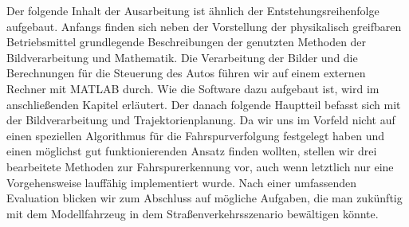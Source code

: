 Der folgende Inhalt der Ausarbeitung ist ähnlich der Entstehungsreihenfolge aufgebaut. Anfangs finden sich neben der Vorstellung der physikalisch greifbaren Betriebsmittel grundlegende Beschreibungen der genutzten Methoden der Bildverarbeitung und Mathematik. Die Verarbeitung der Bilder und die Berechnungen für die Steuerung des Autos führen wir auf einem externen Rechner mit MATLAB durch. Wie die Software dazu aufgebaut ist, wird im anschließenden Kapitel erläutert. Der danach folgende Hauptteil befasst sich mit der Bildverarbeitung und Trajektorienplanung. Da wir uns im Vorfeld nicht auf einen speziellen Algorithmus für die Fahrspurverfolgung festgelegt haben und einen möglichst gut funktionierenden Ansatz finden wollten, stellen wir drei bearbeitete Methoden zur Fahrspurerkennung vor, auch wenn letztlich nur eine Vorgehensweise lauffähig implementiert wurde. Nach einer umfassenden Evaluation blicken wir zum Abschluss auf mögliche Aufgaben, die man zukünftig mit dem Modellfahrzeug in dem Straßenverkehrsszenario bewältigen könnte.



